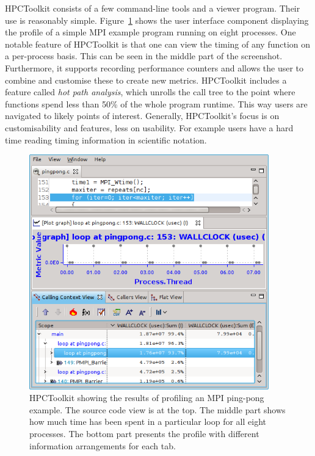 \documentclass[a4paper, final, diplominf]{zih-template}
\begin{document}
HPCToolkit consists of a few command-line tools and a viewer program.
Their use is reasonably simple.
Figure~\ref{fig:hpctoolkit} shows the user interface component displaying the profile of a simple MPI example program running on eight processes.
One notable feature of HPCToolkit is that one can view the timing of any function on a per-process basis.
This can be seen in the middle part of the screenshot.
Furthermore, it supports recording performance counters and allows the user to combine and customise these to create new metrics.
HPCToolkit includes a feature called \emph{hot path analysis}, which unrolls the call tree to the point where functions spend less than 50\% of the whole program runtime.
This way users are navigated to likely points of interest.
Generally, HPCToolkit's focus is on customisability and features, less on usability.
For example users have a hard time reading timing information in scientific notation.
\begin{figure}[tb]
	\centering
	\includegraphics[width=10.37cm]{hpctoolkit}
	\caption{HPCToolkit showing the results of profiling an MPI ping-pong example. The source code view is at the top. The middle part shows how much time has been spent in a particular loop for all eight processes. The bottom part presents the profile with different information arrangements for each tab.}
	\label{fig:hpctoolkit}
\end{figure}
\end{document}
